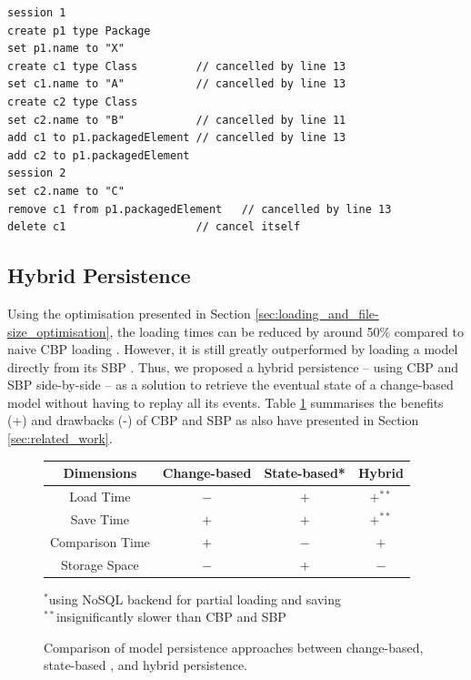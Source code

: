 \documentclass[sigplan,review,anonymous]{acmart}\settopmatter{printfolios=true,printccs=false,printacmref=false}
\begin{document}
\begin{lstlisting}[style=eol,caption={The optimised version of the CBP in List. \ref{lst:cbpmodel}.},label=lst:cbpmodel_optimised]
session 1
create p1 type Package
set p1.name to "X" 
create c1 type Class         // cancelled by line 13
set c1.name to "A"           // cancelled by line 13
create c2 type Class
set c2.name to "B"           // cancelled by line 11
add c1 to p1.packagedElement // cancelled by line 13
add c2 to p1.packagedElement
session 2
set c2.name to "C"
remove c1 from p1.packagedElement   // cancelled by line 13  
delete c1                    // cancel itself
\end{lstlisting}



\subsection{Hybrid Persistence}
\label{sec:hybrid_model_persistence}
Using the optimisation presented in Section \ref{sec:loading_and_file-size_optimisation}, the loading times can be reduced by around 50\% compared to naive CBP loading \cite{yohannis2018towards}. However, it is still greatly outperformed by loading a model directly from its SBP \cite{yohannis2018towards}. Thus, we proposed a hybrid persistence -- using CBP and SBP side-by-side -- as a solution to retrieve the eventual state of a change-based model without having to replay all its events. Table \ref{table:persistence_comparsion} summarises the benefits (+) and drawbacks (-) of CBP and SBP as also have presented in Section \ref{sec:related_work}.

\begin{figure}[ht]
    \begin{small}
        \caption{Comparison of model persistence approaches between change-based, state-based 
           , and hybrid persistence.}
        \label{table:persistence_comparsion}
        \begin{tabular}{ c c c c }
            \hline 
            \textbf{Dimensions} & \textbf{Change-based} & \textbf{State-based*} & \textbf{Hybrid} \\ 
            \hline 
            Load Time & $-$ & $+$ & $+^{**}$ \\
            Save Time & $+$ & $+$ & $+^{**}$ \\
            Comparison Time & $+$ & $-$ & $+$ \\
            Storage Space & $-$ & $+$ & $-$ \\
            \hline 
        \end{tabular}
        $^*$using NoSQL backend for partial loading and saving\\$^{**}$insignificantly slower than CBP and SBP
    \end{small}
\end{figure}
\end{document}
